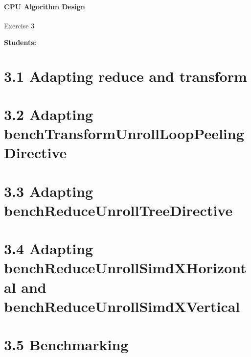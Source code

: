 





\begin{Large}
    \textsf{\textbf{CPU Algorithm Design}} \\
    \\
    Exercise 3
\end{Large}
\vspace{1ex}
\textsf{\textbf{Students:}}  \\
\vspace{2ex}

\section*{3.1 Adapting reduce and transform}

\pagebreak

\section*{3.2 Adapting benchTransformUnrollLoopPeelingDirective}

\pagebreak

\section*{3.3 Adapting benchReduceUnrollTreeDirective}

\pagebreak

\section*{3.4 Adapting benchReduceUnrollSimdXHorizontal and benchReduceUnrollSimdXVertical}

\pagebreak

\section*{3.5 Benchmarking}

